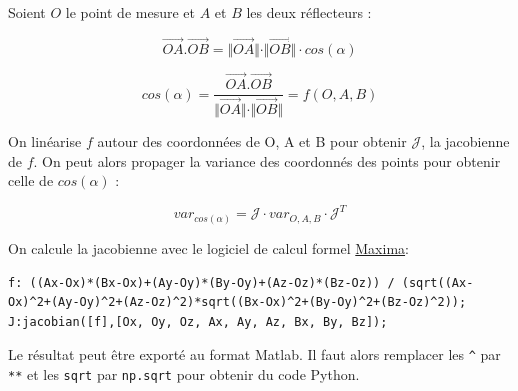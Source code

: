 \documentclass[french]{report}
\begin{document}
Soient $O$ le point de mesure et $A$ et $B$ les deux réflecteurs :

$$\overrightarrow{OA} .  \overrightarrow{OB} = \Vert\overrightarrow{OA}\Vert \cdot \Vert\overrightarrow{OB}\Vert \cdot cos(\alpha)$$

$$cos(\alpha) = \frac{\overrightarrow{OA} .  \overrightarrow{OB}}{\Vert\overrightarrow{OA}\Vert \cdot \Vert\overrightarrow{OB}\Vert} = f(O, A, B)$$

On linéarise $f$ autour des coordonnées de O, A et B pour obtenir $\mathcal{J}$, la jacobienne de $f$.
On peut alors propager la variance des coordonnés des points pour obtenir celle de $cos(\alpha)$ :

$$var_{cos(\alpha)} = \mathcal{J} \cdot var_{O,A,B} \cdot \mathcal{J}^T$$

On calcule la jacobienne avec le logiciel de calcul formel \href{https://maxima.sourceforge.io}{Maxima}:
\begin{lstlisting}
f: ((Ax-Ox)*(Bx-Ox)+(Ay-Oy)*(By-Oy)+(Az-Oz)*(Bz-Oz)) / (sqrt((Ax-Ox)^2+(Ay-Oy)^2+(Az-Oz)^2)*sqrt((Bx-Ox)^2+(By-Oy)^2+(Bz-Oz)^2));
J:jacobian([f],[Ox, Oy, Oz, Ax, Ay, Az, Bx, By, Bz]);
\end{lstlisting}

Le résultat peut être exporté au format Matlab. Il faut alors remplacer les 
\texttt{\^} par \texttt{**} et les \texttt{sqrt} par \texttt{np.sqrt} pour obtenir du code Python.
\end{document}

